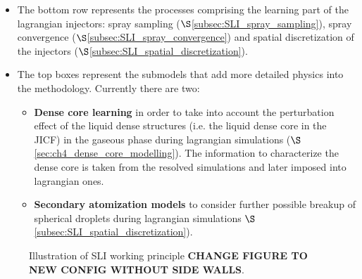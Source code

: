 \begin{itemize}

	\item The bottom row represents the processes comprising the learning part of the lagrangian injectors: spray sampling ($\S$\ref{subsec:SLI_spray_sampling}), spray convergence ($\S$\ref{subsec:SLI_spray_convergence}) and spatial discretization of the injectors ($\S$\ref{subsec:SLI_spatial_discretization}).
	
	\item The top boxes represent the submodels that add more detailed physics into the methodology. Currently there are two: 
	
	\begin{itemize}
	
		\item \textbf{Dense core learning} in order to take into account the perturbation effect of the liquid dense structures (i.e. the liquid dense core in the JICF) in the gaseous phase during lagrangian simulations ($\S$\ref{sec:ch4_dense_core_modelling}). The information to characterize the dense core is taken from the resolved simulations and later imposed into lagrangian ones.
		
		\item \textbf{Secondary atomization models} to consider further possible breakup of spherical droplets during lagrangian simulations $\S$\ref{subsec:SLI_spatial_discretization}).
		
	\end{itemize}


\end{itemize}
	
	
\begin{figure}[h!]	
	\centering
	\caption{Illustration of SLI working principle \textbf{CHANGE FIGURE TO NEW CONFIG WITHOUT SIDE WALLS}.}
	\label{fig:SLI_graphic_description}
\end{figure}


%






